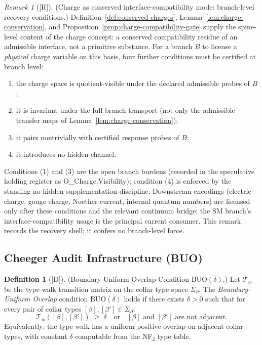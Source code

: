 \documentclass[12pt,oneside]{amsbook}
\theoremstyle{plain}
\theoremstyle{definition}
\newtheorem{definition}[theorem]{Definition}
\theoremstyle{remark}
\newtheorem{remark}[theorem]{Remark}
\newcommand{\status}[1]{\textup{[#1]}}
\begin{document}
\begin{remark}[\status{R}]\label{rmk:charge-recovery-shell}
\textup{(Charge as conserved interface-compatibility mode:
branch-level recovery conditions.)}
Definition~\ref{def:conserved-charges},
Lemma~\ref{lem:charge-conservation}, and
Proposition~\ref{prop:charge-compatibility-gate} supply the
spine-level content of the charge concept: a conserved
compatibility residue of an admissible interface, not a primitive
substance.  For a branch $B$ to license a \emph{physical} charge
variable on this basis, four further conditions must be certified
at branch level:
\begin{enumerate}[label=\textup{(\arabic*)}]
  \item the charge space is quotient-visible under the declared
        admissible probes of $B$;
  \item it is invariant under the full branch transport (not only
        the admissible transfer maps of
        Lemma~\ref{lem:charge-conservation});
  \item it pairs nontrivially with certified response probes of
        $B$;
  \item it introduces no hidden channel.
\end{enumerate}
Conditions (1) and (3) are the open branch burdens (recorded in
the speculative holding register as O\_Charge.Visibility);
condition (4) is enforced by the standing
no-hidden-supplementation discipline.  Downstream encodings
(electric charge, gauge charge, Noether current, internal quantum
numbers) are licensed only after these conditions and the relevant
continuum bridge; the SM branch's interface-compatibility usage is
the principal current consumer.  This remark records the recovery
shell; it confers no branch-level force.
\end{remark}

\subsection{Cheeger Audit Infrastructure (BUO)}

\begin{definition}[\status{D}]\label{def:BUO}
\textup{(Boundary-Uniform Overlap Condition $\mathrm{BUO}(\delta)$.)}
Let $\mathcal{T}_w$ be the type-walk transition matrix on the
collar type space $\Sigma_\partial$.  The \emph{Boundary-Uniform
Overlap} condition $\mathrm{BUO}(\delta)$ holds if there exists
$\delta > 0$ such that for every pair of collar types
$[\beta], [\beta'] \in \Sigma_\partial$:
\[
  \mathcal{T}_w([\beta], [\beta']) \;\geq\; \delta
  \quad\text{or}\quad
  [\beta] \text{ and } [\beta'] \text{ are not adjacent.}
\]
Equivalently: the type walk has a uniform positive overlap on
adjacent collar types, with constant $\delta$ computable from
the NF$_2$ type table.
\end{definition}
\end{document}
